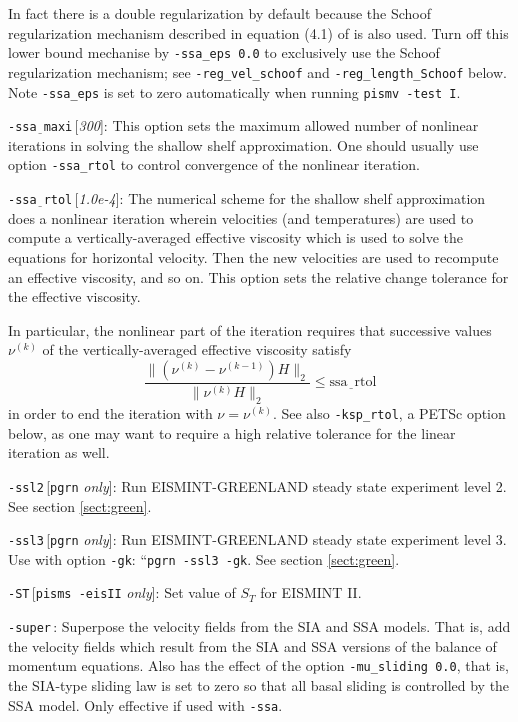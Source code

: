 \documentclass[11pt,final]{amsart}
\newcommand{\rawopt}[1]{\vspace{1mm}\noindent \large\texttt{-#1}\normalsize}
\newcommand{\opt}[1]{\rawopt{#1}\,:\quad}
\newcommand{\optdef}[2]{\rawopt{#1}\,[\textsl{#2}]:\quad}
\newcommand{\optrestrict}[2]{\rawopt{#1}\,[\texttt{#2} \textsl{only}]:\quad}
\newcommand{\und}{$\underline{\,\,\,}$}
\begin{document}
In fact there is a double regularization by default because the Schoof regularization mechanism described in equation (4.1) of \cite{SchoofStream} is also used.  Turn off this lower bound mechanise by \verb|-ssa_eps 0.0| to exclusively use the Schoof regularization mechanism; see \verb|-reg_vel_schoof| and \verb|-reg_length_Schoof| below.  Note \verb|-ssa_eps| is set to zero automatically when running \verb|pismv -test I|.

\optdef{ssa\und maxi}{300}  This option sets the maximum allowed number of nonlinear iterations in solving the shallow shelf approximation.  One should usually use option \verb|-ssa_rtol| to control convergence of the nonlinear iteration.

\optdef{ssa\und rtol}{1.0e-4}  The numerical scheme for the shallow shelf approximation \cite{WeisGreveHutter} does a nonlinear iteration wherein velocities (and temperatures) are used to compute a vertically-averaged effective viscosity which is used to solve the equations for horizontal velocity.  Then the new velocities are used to recompute an effective viscosity, and so on.  This option sets the relative change tolerance for the effective viscosity.

In particular, the nonlinear part of the iteration requires that successive values $\nu^{(k)}$ of the vertically-averaged effective viscosity satisfy
	$$\frac{\|(\nu^{(k)} - \nu^{(k-1)}) H\|_2}{\|\nu^{(k)} H\|_2} \le \text{ssa\und rtol}$$
in order to end the iteration with $\nu = \nu^{(k)}$.  See also \verb|-ksp_rtol|, a PETSc option below, as one may want to require a high relative tolerance for the linear iteration as well.

\optrestrict{ssl2}{pgrn}    Run EISMINT-GREENLAND steady state experiment level 2. See section \ref{sect:green}.

\optrestrict{ssl3}{pgrn}    Run EISMINT-GREENLAND steady state experiment level 3.  Use with option \verb|-gk|: ``\verb|pgrn -ssl3 -gk|.  See section \ref{sect:green}.

\optrestrict{ST}{pisms -eisII}    Set value of $S_T$ for EISMINT II.

\opt{super}  Superpose the velocity fields from the SIA and SSA models.  That is, add the velocity fields which result from the SIA and SSA versions of the balance of momentum equations.  Also has the effect of the option \verb|-mu_sliding 0.0|, that is, the SIA-type sliding law is set to zero so that all basal sliding is controlled by the SSA model.  Only effective if used with \verb|-ssa|.
\end{document}
